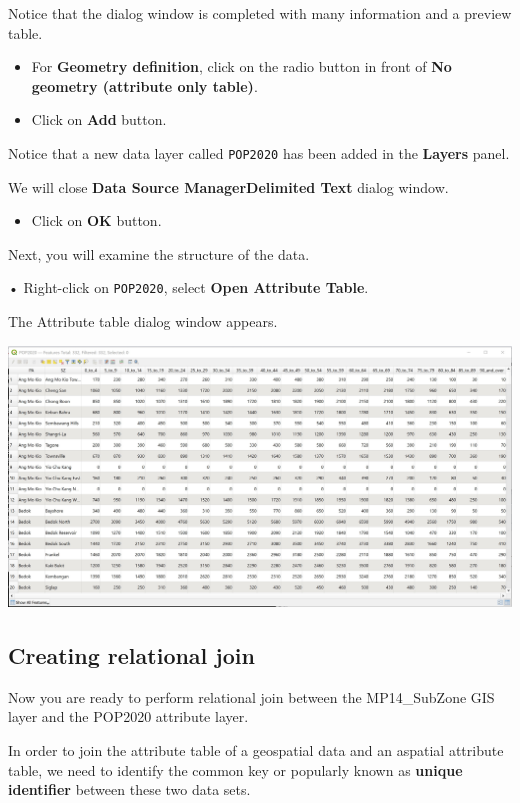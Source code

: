 \documentclass[
  letterpaper,
  DIV=11,
  numbers=noendperiod]{scrreprt}
\providecommand{\tightlist}{%
  \setlength{\itemsep}{0pt}\setlength{\parskip}{0pt}}\usepackage{longtable,booktabs,array}
\begin{document}
Notice that the dialog window is completed with many information and a
preview table.

\begin{itemize}
\tightlist
\item
  For \textbf{Geometry definition}, click on the radio button in front
  of \textbf{No geometry (attribute only table)}.
\item
  Click on \textbf{Add} button.
\end{itemize}

Notice that a new data layer called \texttt{POP2020} has been added in
the \textbf{Layers} panel.

We will close \textbf{Data Source Manager\textbar Delimited Text} dialog
window.

\begin{itemize}
\tightlist
\item
  Click on \textbf{OK} button.
\end{itemize}

Next, you will examine the structure of the data.

• Right-click on \texttt{POP2020}, select \textbf{Open Attribute Table}.

The Attribute table dialog window appears.

\includegraphics{./img03/image21.jpg}

\hypertarget{creating-relational-join}{%
\subsection{Creating relational join}\label{creating-relational-join}}

Now you are ready to perform relational join between the MP14\_SubZone
GIS layer and the POP2020 attribute layer.

In order to join the attribute table of a geospatial data and an
aspatial attribute table, we need to identify the common key or
popularly known as \textbf{unique identifier} between these two data
sets.
\end{document}
